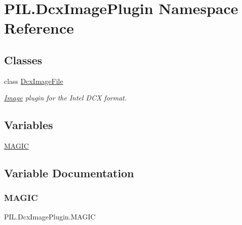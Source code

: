 \hypertarget{namespacePIL_1_1DcxImagePlugin}{}\section{P\+I\+L.\+Dcx\+Image\+Plugin Namespace Reference}
\label{namespacePIL_1_1DcxImagePlugin}
\subsection*{Classes}
\begin{DoxyCompactItemize}
\item 
class \hyperlink{classPIL_1_1DcxImagePlugin_1_1DcxImageFile}{Dcx\+Image\+File}
\begin{DoxyCompactList}\small\item\em \hyperlink{namespacePIL_1_1Image}{Image} plugin for the Intel D\+CX format. \end{DoxyCompactList}\end{DoxyCompactItemize}
\subsection*{Variables}
\begin{DoxyCompactItemize}
\item 
\hyperlink{namespacePIL_1_1DcxImagePlugin_ab45512e011b18d5b6725bb02f1d311c8}{M\+A\+G\+IC}
\end{DoxyCompactItemize}


\subsection{Variable Documentation}
\mbox{\label{namespacePIL_1_1DcxImagePlugin_ab45512e011b18d5b6725bb02f1d311c8}} 
\subsubsection{\texorpdfstring{M\+A\+G\+IC}{MAGIC}}
{\footnotesize\ttfamily P\+I\+L.\+Dcx\+Image\+Plugin.\+M\+A\+G\+IC}

